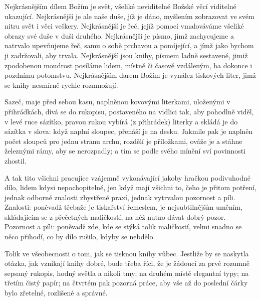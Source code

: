 Nejkrásnějším dílem Božím je svět, všeliké neviditelné Božské věcí viditelné
ukazující. Nejkrásnější je ale naše duše, jíž je dáno, myšlením zobrazovat
ve svém nitru svět i věci veškery. Nejkrásnější je řeč, jejíž pomocí
vmalováváme všeliké obrazy své duše v duši druhého. Nejkrásnější je písmo,
jímž zachycujeme a natrvalo upevňujeme řeč, samu o sobě prchavou a
pomíjející, a jímž jako bychom ji zadržovali, aby trvala. Nejkrásnější jsou
knihy, písmem ladně sestavené, jimiž zpodobenou moudrost posíláme lidem,
místně či časově vzdáleným, ba dokonce i pozdnímu potomstvu. Nejkrásnějším
darem Božím je vynález tiskových liter, jimž se knihy nesmírně rychle
rozmnožují. 

Sazeč, maje před sebou kasu, naplněnou kovovými literkami, uloženými v
přihrádkách, dívá se do rukopisu, postaveného na vidlici tak, aby pohodlně
viděl, v levé ruce sázítko, pravou rukou vybírá (z přihrádek) literky a
skládá je do sázítka v slova: když naplní sloupec, přenáší je na desku.
Jakmile pak je naplněn počet sloupců pro jednu stranu archu, rozdělí je
příložkami, ováže je a stáhne železnými rámy, aby se nerozpadly; a tím se
podle svého mínění sví povinnosti zhostil.

A tak tito všichni pracujíce vzájemně vykonávající jakoby hračkou
podivuhodné dílo, lidem kdysi nepochopitelné, jen když mají všichni to, čeho
je přitom potření, jednak odborné znalosti zbystřené praxí, jednak vytrvalou
pozornost a píli. Znalosti: poněvadž třebaže je tiskařství řemeslem, je
nejsubtilnějším uměním, skládajícím se z přečetných maličkostí, na něž nutno
dávat dobrý pozor. Pozornost a píli: poněvadž zde, kde se stýká tolik
maličkostí, velmi snadno se něco přihodí, co by dílo rušilo, kdyby se
nebdělo.

Tolik ve všeobecnosti o tom, jak se tisknou knihy vůbec. Jestliže by se
naskytla otázka, jak vznikají knihy dobré, bude třeba říci, že je žádoucí za
prvé rozumně sepsaný rukopis, hodný světla a nikoli tmy; na druhém místě
elegantní typy; na třetím čistý papír; na čtvrtém pak pozorná práce, aby vše
až do poslední čárky bylo zřetelné, rozlišené a správné.
